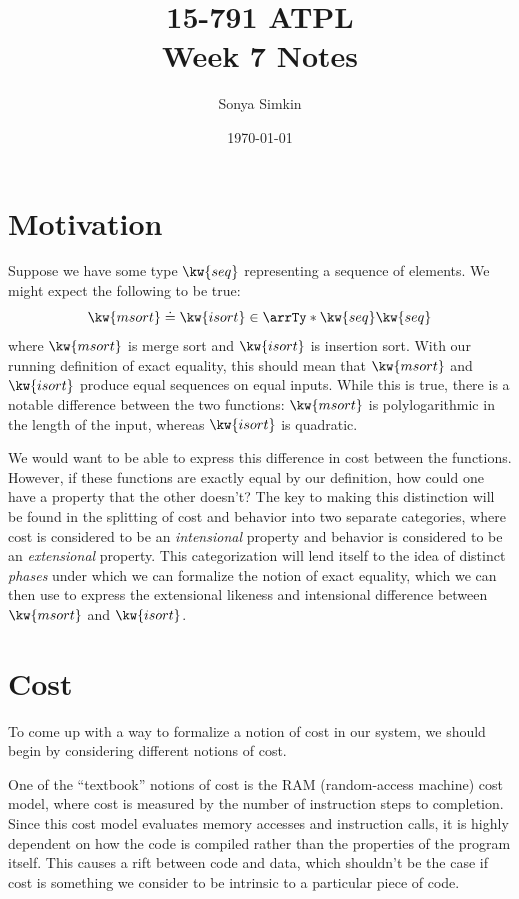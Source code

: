 \documentclass[letterpaper]{article}
\title{15-791 ATPL \\ Week 7 Notes}
\author{Sonya Simkin}
\date{\today}
\begin{document}
\maketitle

\section{Motivation}

Suppose we have some type $\kw{seq}$ representing a sequence of elements. We might expect the following to be true:
\[\exEqOf{\kw{msort}}{\kw{isort}}{\arrTy*{\kw{seq}}{\kw{seq}}}\]
where $\kw{msort}$ is merge sort and $\kw{isort}$ is insertion sort. With our running definition of exact equality,
this should mean that $\kw{msort}$ and $\kw{isort}$ produce equal sequences on equal inputs. While this is true, there is a notable difference
between the two functions: $\kw{msort}$ is polylogarithmic in the length of the input, whereas $\kw{isort}$ is quadratic.

We would want to be able to express this difference in cost between the functions. However, if these functions are exactly equal by our definition, how could
one have a property that the other doesn't? The key to making this distinction will be found in the splitting of cost and behavior into two separate categories,
where cost is considered to be an \textit{intensional} property and behavior is considered to be an \textit{extensional} property. This categorization will
lend itself to the idea of distinct \textit{phases} under which we can formalize the notion of exact equality, which we can then use to express the extensional likeness
and intensional difference between $\kw{msort}$ and $\kw{isort}$.

\section{Cost}

To come up with a way to formalize a notion of cost in our system, we should begin by considering different notions of cost.

One of the ``textbook'' notions of cost is the RAM (random-access machine) cost model, where cost is measured by the number of instruction steps to completion.
Since this cost model evaluates memory accesses and instruction calls, it is highly dependent on how the code is compiled rather than the properties of the program itself. This causes a rift between
code and data, which shouldn't be the case if cost is something we consider to be intrinsic to a particular piece of code.
\end{document}

